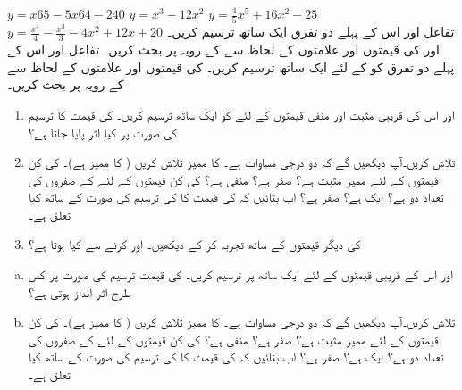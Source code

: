 $y=x65-5x64-240$
$y=x^3-12x^2$
$y=\tfrac{4}{5}x^5+16x^2-25$
$y=\tfrac{x^4}{4}-\tfrac{x^3}{3}-4x^2+12x+20$
تفاعل  اور اس کے پہلے دو تفرق ایک ساتھ ترسیم کریں۔  اور  کی قیمتوں اور علامتوں کے لحاظ سے  کے رویہ پر بحث کریں۔
تفاعل  اور اس کے پہلے دو تفرق کو  کے لئے ایک ساتھ ترسیم کریں۔  کی قیمتوں اور علامتوں کے لحاظ سے  کے رویہ پر بحث کریں۔
\begin{enumerate}
\item
{} اور  اس کی قریبی مثبت اور منفی قیمتوں کے لئے  کو ایک ساتھ ترسیم کریں۔ کی قیمت کا ترسیم کی صورت پر کیا اثر پایا جاتا ہے؟
\item
{} تلاش کریں۔آپ دیکھیں گے کہ  دو درجی مساوات ہے۔  کا ممیز تلاش کریں ( کا ممیز  ہے)۔  کی کن قیمتوں کے لئے ممیز مثبت ہے؟ صفر ہے؟ منفی ہے؟  کی کن قیمتوں کے لئے  کے  صفروں کی تعداد دو ہے؟ ایک ہے؟  صفر ہے؟ اب بتائیں کہ  کی قیمت کا  کی ترسیم کی صورت کے ساتھ کیا تعلق ہے۔
\item
{} کی دیگر قیمتوں کے ساتھ تجربہ کر کے دیکھیں۔  اور  کرنے سے کیا ہوتا ہے؟
\end{enumerate}
\begin{enumerate}[a.]
\item
{} اور اس کے قریبی قیمتوں کے لئے  ایک ساتھ  پر  ترسیم کریں۔  کی قیمت ترسیم کی صورت پر کس طرح اثر انداز ہوتی ہے؟
\item
{} تلاش کریں۔آپ دیکھیں گے کہ  دو درجی مساوات ہے۔  کا ممیز تلاش کریں ( کا ممیز  ہے)۔  کی کن قیمتوں کے لئے ممیز مثبت ہے؟ صفر ہے؟ منفی ہے؟  کی کن قیمتوں کے لئے  کے  صفروں کی تعداد دو ہے؟ ایک ہے؟  صفر ہے؟ اب بتائیں کہ  کی قیمت کا  کی ترسیم کی صورت کے ساتھ کیا تعلق ہے۔
\end{enumerate}
